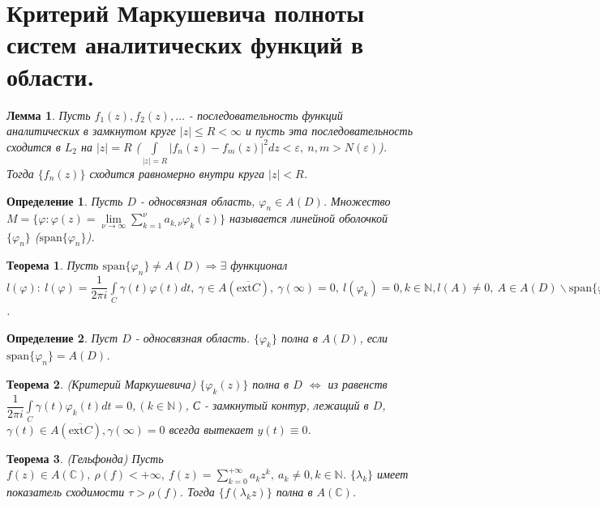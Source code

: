 \documentclass[9pt]{article}
\newtheorem{theorem}{Теорема} %
\newtheorem{lemma}{Лемма} %
\newtheorem{definition}{Определение}
\begin{document}
		\section{ Критерий Маркушевича полноты систем аналитических функций в области.}
		\begin{lemma}
			Пусть $f_1(z), f_2(z), \dots$ - последовательность функций аналитических в замкнутом круге $|z| \leq R < \infty$ и пусть эта последовательность сходится в $L_2$ на $|z| = R$ ($\int\limits_{|z|=R} |f_n(z) - f_m(z)|^2 dz < \varepsilon , \ n,m > N(\varepsilon)$). Тогда $\{f_n(z)\}$ сходится равномерно внутри круга $|z| < R$.
		\end{lemma}
		\begin{definition}
			Пусть $D$ - односвязная область, $\varphi_n \in A(D)$. Множество $M = \{\varphi: \varphi(z) = \lim\limits_{\nu \to \infty} \sum\limits_{k=1}^{\nu} a_{k,\nu} \varphi_k(z)\}$ называется линейной оболочкой $\{\varphi_n\}$ ($\mathrm{span}\{\varphi_n\}$).
			\end{definition}
		\begin{theorem}
			Пусть $\mathrm{span}\{\varphi_n\} \neq A(D) \Rightarrow \exists$ функционал $l(\varphi): \ l(\varphi) = \dfrac{1}{2\pi i} \int\limits_{C} \gamma(t) \varphi(t) dt, \ \gamma \in A(\overline{\mathrm{ext}C}), \ \gamma(\infty) = 0, \ l(\varphi_k) = 0, k \in \mathbb{N}, l(A) \neq 0, \ A \in A(D) \backslash \mathrm{span}\{\varphi_n\}$.
		\end{theorem}
		\begin{definition}
			Пуст $D$ - односвязная область. $\{\varphi_k\}$ полна в $A(D)$, если $\mathrm{span}\{\varphi_n\} = A(D)$.
		\end{definition}
		\begin{theorem} (Критерий Маркушевича)\newline
			$\{\varphi_k(z)\}$ полна в $D$ $\Leftrightarrow$ из равенств $\dfrac{1}{2\pi i} \int\limits_C \gamma(t) \varphi_k(t) dt = 0, (k \in \mathbb{N})$, С - замкнутый контур, лежащий в $D$, $\gamma(t) \in A(\overline{\mathrm{ext} C}), \gamma(\infty) = 0$ всегда вытекает $y(t) \equiv 0$.
		\end{theorem}
		\begin{theorem} (Гельфонда)\newline
			Пусть $f(z) \in A(\mathbb{C}), \ \rho(f) < + \infty, \ f(z) = \sum\limits_{k=0}^{+\infty} a_kz^k, \ a_k \neq 0, k \in \mathbb{N}$. $\{\lambda_k\}$ имеет показатель сходимости $\tau > \rho(f)$. Тогда $\{f(\lambda_kz)\}$ полна в $A(\mathbb{C})$.
		\end{theorem}
\end{document}

